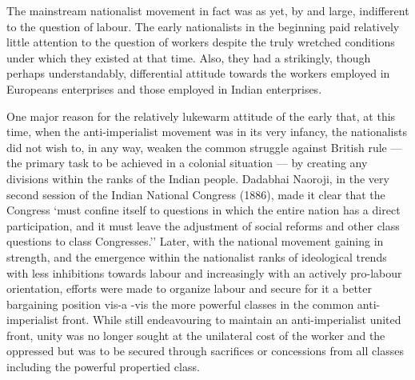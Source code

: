 The mainstream nationalist movement in fact was as yet, by and large, indifferent to the question of labour. The early nationalists in the beginning paid relatively little attention to the question of workers despite the truly wretched conditions under which they existed at that time. Also, they had a strikingly, though perhaps understandably, differential attitude towards the workers employed in Europeans enterprises and those employed in Indian enterprises.

One major reason for the relatively lukewarm attitude of the early that, at this time, when the anti-imperialist movement was in its very infancy, the nationalists did not wish to, in any way, weaken the common struggle against British rule — the primary task to be achieved in a colonial situation — by creating any divisions within the ranks of the Indian people. Dadabhai Naoroji, in the very second session of the Indian National Congress (1886), made it clear that the Congress `must confine itself to questions in which the entire nation has a direct participation, and it must leave the adjustment of social reforms and other class questions to class Congresses.'' Later, with the national movement gaining in strength, and the emergence within the nationalist ranks of ideological trends with less inhibitions towards labour and increasingly with an actively pro-labour orientation, efforts were made to organize labour and secure for it a better bargaining position vis-a -vis the more powerful classes in the common anti-imperialist front. While still endeavouring to maintain an anti-imperialist united front, unity was no longer sought at the unilateral cost of the worker and the oppressed but was to be secured through sacrifices or concessions from all classes including the powerful propertied class.

